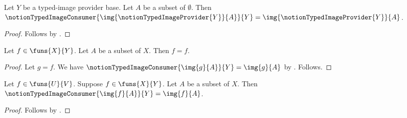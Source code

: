 \begin{proposition}\label{notion_typed_image_provider_derived}
    Let $Y$ be a typed-image provider base.
    Let $A$ be a subset of $\emptyset$.
    Then $\notionTypedImageConsumer
        {\img{\notionTypedImageProvider{Y}}{A}}{Y}
        =\img{\notionTypedImageProvider{Y}}{A}$.
\end{proposition}
\begin{proof}
    Follows by .
\end{proof}

\begin{proposition}\label{notion_typed_image_alias_transport}
    Let $f\in\funs{X}{Y}$.
    Let $A$ be a subset of $X$.
    Then $f=f$.
\end{proposition}
\begin{proof}
    Let $g=f$.
    We have $\notionTypedImageConsumer{\img{g}{A}}{Y}=\img{g}{A}$
        by .
    Follows.
\end{proof}

\begin{proposition}\label{notion_typed_image_correlated_endpoints}
    Let $f\in\funs{U}{V}$.
    Suppose $f\in\funs{X}{Y}$.
    Let $A$ be a subset of $X$.
    Then $\notionTypedImageConsumer{\img{f}{A}}{Y}=\img{f}{A}$.
\end{proposition}
\begin{proof}
    Follows by .
\end{proof}
